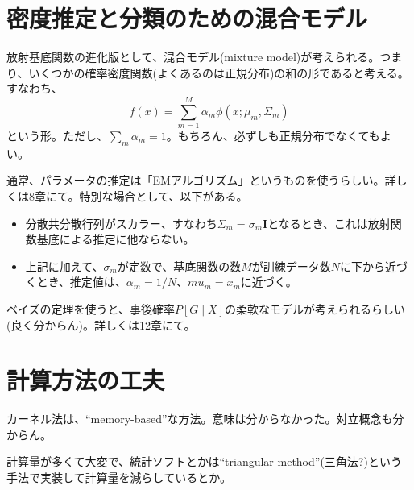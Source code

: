\documentclass[uplatex]{jsarticle}
\begin{document}
\section{密度推定と分類のための混合モデル}
放射基底関数の進化版として、混合モデル(mixture model)が考えられる。つまり、いくつかの確率密度関数(よくあるのは正規分布)の和の形であると考える。すなわち、
\[
  f(x)=\sum_{m=1}^{M}\alpha_{m}\phi(x;\mu_{m},\Sigma_{m})
\]
という形。ただし、$\sum_{m}\alpha_{m}=1$。もちろん、必ずしも正規分布でなくてもよい。

通常、パラメータの推定は「EMアルゴリズム」というものを使うらしい。詳しくは8章にて。特別な場合として、以下がある。
\begin{itemize}
  \item 分散共分散行列がスカラー、すなわち$\Sigma_m=\sigma_m\mathbf{I}$となるとき、これは放射関数基底による推定に他ならない。

  \item 上記に加えて、$\sigma_m$が定数で、基底関数の数$M$が訓練データ数$N$に下から近づくとき、推定値は、$\alpha_m=1/N$、$mu_m=x_m$に近づく。
\end{itemize}

ベイズの定理を使うと、事後確率$P[G\mid X]$の柔軟なモデルが考えられるらしい(良く分からん)。詳しくは12章にて。

\section{計算方法の工夫}
カーネル法は、``memory-based''な方法。意味は分からなかった。対立概念も分からん。

計算量が多くて大変で、統計ソフトとかは``triangular method''(三角法?)という手法で実装して計算量を減らしているとか。
\end{document}

